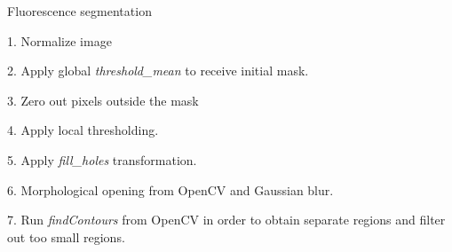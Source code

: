 

\begin{algorithm}
    \caption{Fluorescence segmentation}
    \begin{algorithmic}
    \item 1. Normalize image
    \item 2. Apply global \textit{threshold\_mean} to receive initial mask.
    \item 3. Zero out pixels outside the mask
    \item 4. Apply local thresholding.  
    \item 5. Apply \textit{fill\_holes} transformation.
    \item 6. Morphological opening from OpenCV and Gaussian blur.
    \item 7. Run \textit{findContours} from OpenCV in order to obtain separate regions and filter out too small regions.
    \end{algorithmic}
    \label{alg:er-global-thresholding}
\end{algorithm}    


